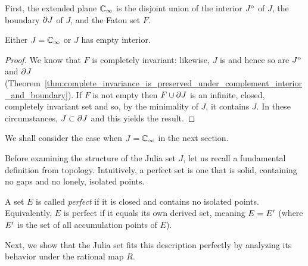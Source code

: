 \begin{remark}[$\ExtC = \interior{J} \cup \boundary{J} \cup F$]
    First, the extended plane $\mathbb{C}_\infty$ is the disjoint union of the interior
    ${J}^{\mathrm{o}}$ of $J$, the boundary $\partial {J}$ of $J$, and the Fatou set
    $F$.
\end{remark}

\begin{theorem}[$J = \ExtC$ or $\interior{J} = \emptyset$]
    Either $J = \ExtC$ or $J$ has empty interior.
\end{theorem}
\begin{proof}
    We know that $F$ is completely invariant: likewise, $J$ is and hence so are
    ${J}^{\mathrm{o}}$ and $\partial {J}$
    (Theorem~\ref{thm:complete_invariance_is_preserved_under_complement_interior_and_boundary}).
    If $F$ is not empty then $F \cup \partial {J}$ is an infinite, closed,
    completely invariant set and so, by the minimality of $J$, it contains $J$.
    In these circumstances, $J \subset \partial {J}$ and this yields the result.
\end{proof}

We shall consider the case when $J = \ExtC$ in the next section.

Before examining the structure of the Julia set $J$, let us recall a fundamental
definition from topology. Intuitively, a perfect set is one that is solid,
containing no gaps and no lonely, isolated points.

\begin{definition}
    A set $E$ is called \emph{perfect} if it is closed and contains no isolated
    points. Equivalently, $E$ is perfect if it equals its own derived set,
    meaning $E = {E}'$ (where ${E}'$ is the set of all
    accumulation points of $E$).
\end{definition}

Next, we show that the Julia set fits this description perfectly by analyzing
its behavior under the rational map $R$.

